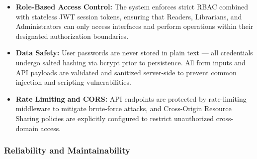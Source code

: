 \begin{itemize}

    \item \textbf{Role-Based Access Control:} The system enforces strict RBAC combined with stateless JWT session tokens, ensuring that Readers, Librarians, and Administrators can only access interfaces and perform operations within their designated authorization boundaries.



    \item \textbf{Data Safety:} User passwords are never stored in plain text --- all credentials undergo salted hashing via bcrypt prior to persistence. All form inputs and API payloads are validated and sanitized server-side to prevent common injection and scripting vulnerabilities.






    \item \textbf{Rate Limiting and CORS:} API endpoints are protected by rate-limiting middleware to mitigate brute-force attacks, and Cross-Origin Resource Sharing policies are explicitly configured to restrict unauthorized cross-domain access.

\end{itemize}



\subsubsection{Reliability and Maintainability}



